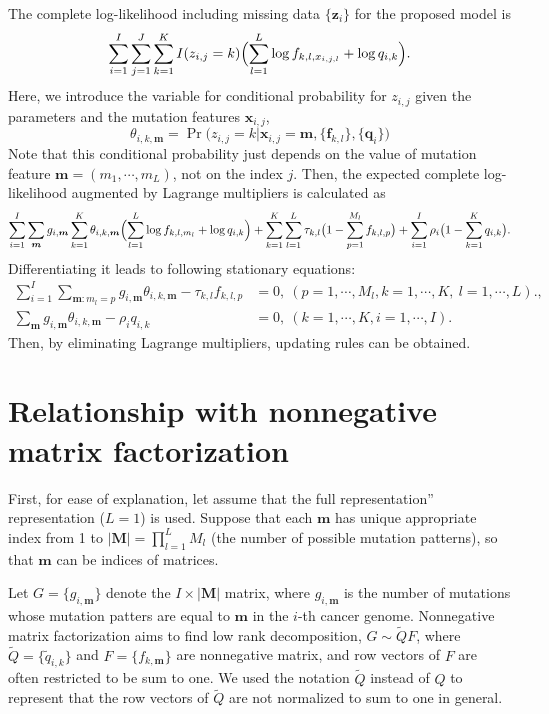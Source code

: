 \documentclass{article}
\begin{document}
The complete log-likelihood including missing data $\{ \bm{z}_i \}$ for the proposed model is
\begin{equation*}
\sum_{i = 1}^I \sum_{j=1}^J \sum_{k=1}^K I(z_{i,j} = k) \Bigl( \sum_{l = 1}^L \log f_{k, l, x_{i,j,l}} + \log q_{i,k} \Bigr).
\end{equation*}
Here, we introduce the variable for conditional probability for $z_{i,j}$ given the parameters and the mutation features $\bm{x}_{i,j}$,
\begin{equation*}
\theta_{i,k, \bm{m}} = \Pr \bigl( z_{i,j} = k \big| \bm{x}_{i, j} = \bm{m}, \{ \bm{f}_{k, l} \}, \{  \bm{q}_i \} \bigr)
\end{equation*}
Note that this conditional probability just depends on the value of mutation feature $\bm{m} = (m_1, \cdots, m_L)$, not on the index $j$.
Then, the expected complete log-likelihood augmented by Lagrange multipliers is calculated as
\begin{equation*}
\sum_{i=1}^I \sum_{\bm{m}} g_{i, \bm{m} } \sum_{k=1}^K \theta_{i, k, \bm{m}}   \Bigl( \sum_{l = 1}^L \log f_{k, l, m_l} + \log q_{i,k} \Bigr)
+ \sum_{k=1}^K \sum_{l=1}^L \tau_{k,l} \bigl( 1 - \sum_{p=1}^{M_l} f_{k,l,p} \bigr)
+ \sum_{i=1}^I \rho_i \bigl( 1 - \sum_{k=1}^K q_{i,k} \bigr).
\end{equation*}
Differentiating it leads to following stationary equations: 
\begin{align*}
\sum_{i=1}^I \sum_{\bm{m}: m_l = p} g_{i, \bm{m}} \theta_{i,k,\bm{m}} - \tau_{k,l} f_{k,l,p} & = 0,\ (p=1, \cdots, M_l, k=1, \cdots, K,\ l=1, \cdots, L)., \\
\sum_{\bm{m}} g_{i,\bm{m}} \theta_{i,k,\bm{m}} - \rho_i q_{i, k} & = 0,\ (k = 1, \cdots, K, i = 1, \cdots, I).
\end{align*}
Then, by eliminating Lagrange multipliers, updating rules can be obtained.



\section*{Relationship with nonnegative matrix factorization}

First, for ease of explanation, let assume that the full representation'' representation ($L = 1$) is used.
Suppose that each $\bm{m}$ has unique appropriate index from 1 to  $| \bm{M} | = \prod_{l=1}^L M_l$ (the number of possible mutation patterns),
so that $\bm{m}$ can be indices of matrices.

Let $G = \{ g_{i, \bm{m}} \}$ denote the $I \times | \bm{M} | $ matrix, 
where $g_{i, \bm{m}}$ is the number of mutations whose mutation patters are equal to $\bm{m}$ in the $i$-th cancer genome.
Nonnegative matrix factorization aims to find low rank decomposition, 
$G \sim \tilde{Q} F$,
where $\tilde{Q} = \{ \tilde{q}_{i,k} \}$ and $F = \{ f_{k, \bm{m}} \}$ are nonnegative matrix, 
and row vectors of $F$ are often restricted to be sum to one. 
We used the notation $\tilde{Q}$ instead of $Q$
to represent that the row vectors of $\tilde{Q}$ are not normalized to sum to one in general.
\end{document}
